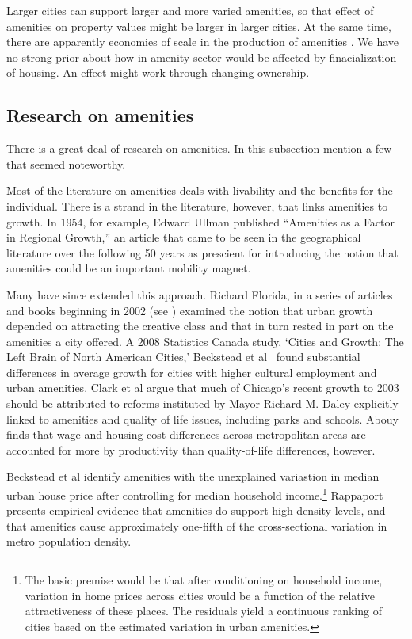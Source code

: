 Larger cities can support larger and more varied amenities, so that effect of amenities on property values might be larger in larger cities. At the same time, there are apparently economies of scale in the production of amenities \cite{kaufmannScalingUrbanAmenities2022}. We have no strong prior about how in amenity sector would be affected by finacialization of housing.  An effect might work through changing ownership.


\subsection{Research on amenities}
There is a great deal of research on amenities. In this subsection mention a few that seemed noteworthy. 

Most of the literature on amenities deals with livability and the benefits for the individual. There is a strand in the literature, however, that links amenities to growth. In 1954, for example, Edward Ullman \cite{ullmanAmenitiesFactorRegional1954} published  ``Amenities as a Factor in Regional Growth,'' an article that came to be seen in the geographical literature over the following 50 years as prescient \cite{walcottCommentsEdwardUllman2010} for introducing the notion that amenities could be an important mobility magnet. 

Many have since extended this approach. Richard Florida, in a series of articles and books beginning in 2002 (see \cite{floridaCreativeClassEconomic2014, floridaEconomicGeographyTalent2002, floridaCompetingAgeTalent2005}) examined the notion that urban growth depended on attracting the creative class and that in turn rested in part on the amenities a city offered. A 2008  Statistics Canada study, `Cities and Growth: The Left Brain of North American Cities,' Beckstead et al \ found substantial differences in average growth for cities with higher cultural employment and urban amenities.  Clark et al \cite{clarkAmenitiesDriveUrban2002} argue that much of Chicago's recent growth to 2003  should be attributed to reforms instituted by Mayor Richard M.  Daley explicitly linked to amenities and quality of life issues, including parks and schools. Abouy \cite{albouyWhatAreCities2016} finds that wage and housing cost differences across metropolitan areas are accounted for more by productivity than quality-of-life differences, however. 

 Beckstead et al  \cite{becksteadCitiesGrowthLeft2008} identify amenities with the unexplained variastion in median urban house price after controlling for median household income.\footnote{  The basic premise would be that after conditioning on household income, variation in home prices across cities would be a function of the relative attractiveness of these places. The residuals yield a continuous ranking of cities based on the estimated variation in urban amenities.} Rappaport \cite{rappaportConsumptionAmenitiesCity2008} presents empirical evidence that amenities do support high-density levels, and that amenities cause approximately one-fifth of the cross-sectional variation in metro population density. 


